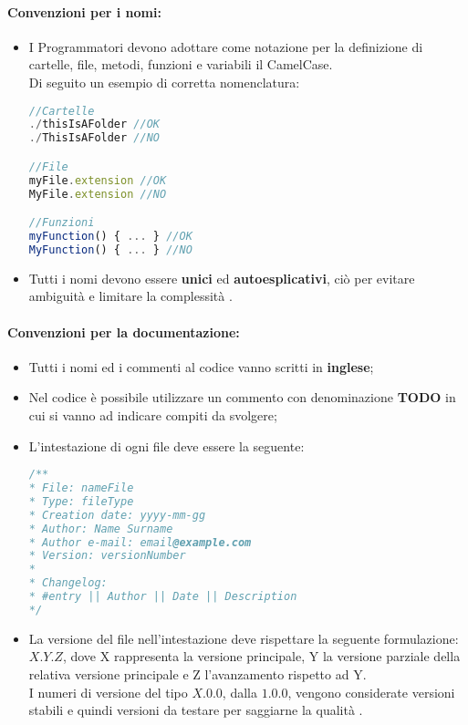 \paragraph{Convenzioni per i nomi:} \label{Nomi}
\begin{itemize}	
	\item I Programmatori devono adottare come notazione per la definizione di cartelle, file, metodi, funzioni e variabili il CamelCase\glossario.\\
	Di seguito un esempio di corretta nomenclatura:
	\begin{lstlisting}[language=JavaScript]
//Cartelle 
./thisIsAFolder	//OK
./ThisIsAFolder //NO

//File
myFile.extension //OK
MyFile.extension //NO

//Funzioni
myFunction() { ... } //OK
MyFunction() { ... } //NO
	\end{lstlisting}

	\item Tutti i nomi devono essere \textbf{unici} ed \textbf{autoesplicativi}, ciò per evitare ambiguità  e limitare la complessità .
\end{itemize}
\paragraph{Convenzioni per la documentazione:}
\begin{itemize}	
	\item Tutti i nomi ed i commenti al codice vanno scritti in \textbf{inglese};
	\item Nel codice è possibile utilizzare un commento con denominazione \textbf{TODO} in cui si vanno ad indicare compiti da svolgere;
	\item L'intestazione di ogni file deve essere la seguente:
	\begin{lstlisting}[language=JavaScript]
/**
* File: nameFile
* Type: fileType
* Creation date: yyyy-mm-gg
* Author: Name Surname
* Author e-mail: email@example.com
* Version: versionNumber 
*
* Changelog:
* #entry || Author || Date || Description
*/
	\end{lstlisting}
	\item La versione del file nell'intestazione deve rispettare la seguente formulazione: $X.Y.Z$, dove X rappresenta la versione principale, Y la versione parziale della relativa versione principale e Z l'avanzamento rispetto ad Y.\\ I numeri di versione del tipo $X.0.0$, dalla $1.0.0$, vengono considerate versioni stabili e quindi versioni da testare per saggiarne la qualità .
\end{itemize}

